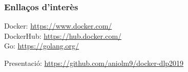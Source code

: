 \begin{frame}
  \frametitle{Enllaços d'interès}
  Docker: \href{https://www.docker.com/}{https://www.docker.com/} \\
  
  DockerHub: \href{https://hub.docker.com/}{https://hub.docker.com/} \\
  
  Go: \href{https://golang.org/}{https://golang.org/}\\
  
  \hrulefill
  
  Presentació: \href{https://github.com/aniolm9/docker-dlp2019}{https://github.com/aniolm9/docker-dlp2019}
\end{frame}